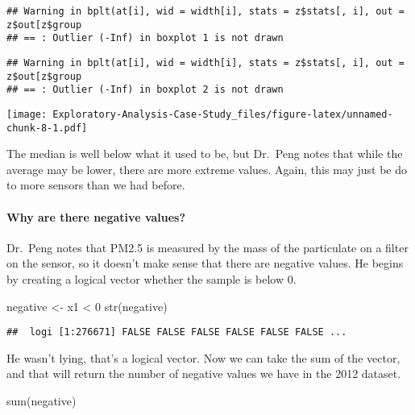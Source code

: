 \documentclass[
]{article}
\newenvironment{Shaded}{\begin{snugshade}}{\end{snugshade}}
\newcommand{\DecValTok}[1]{\textcolor[rgb]{0.00,0.00,0.81}{#1}}
\newcommand{\FunctionTok}[1]{\textcolor[rgb]{0.00,0.00,0.00}{#1}}
\newcommand{\NormalTok}[1]{#1}
\newcommand{\OtherTok}[1]{\textcolor[rgb]{0.56,0.35,0.01}{#1}}
\newcommand{\SpecialCharTok}[1]{\textcolor[rgb]{0.00,0.00,0.00}{#1}}
\begin{document}
\begin{verbatim}
## Warning in bplt(at[i], wid = width[i], stats = z$stats[, i], out = z$out[z$group
## == : Outlier (-Inf) in boxplot 1 is not drawn
\end{verbatim}

\begin{verbatim}
## Warning in bplt(at[i], wid = width[i], stats = z$stats[, i], out = z$out[z$group
## == : Outlier (-Inf) in boxplot 2 is not drawn
\end{verbatim}

\texttt{[image: Exploratory-Analysis-Case-Study\_files/figure-latex/unnamed-chunk-8-1.pdf]}

The median is well below what it used to be, but Dr.~Peng notes that
while the average may be lower, there are more extreme values. Again,
this may just be do to more sensors than we had before.

\hypertarget{why-are-there-negative-values}{%
\paragraph{Why are there negative
values?}\label{why-are-there-negative-values}}

Dr.~Peng notes that PM2.5 is measured by the mass of the particulate on
a filter on the sensor, so it doesn't make sense that there are negative
values. He begins by creating a logical vector whether the sample is
below 0.

\begin{Shaded}
\begin{Highlighting}[]
\NormalTok{negative }\OtherTok{\textless{}{-}}\NormalTok{ x1 }\SpecialCharTok{\textless{}} \DecValTok{0} 
\FunctionTok{str}\NormalTok{(negative)}
\end{Highlighting}
\end{Shaded}

\begin{verbatim}
##  logi [1:276671] FALSE FALSE FALSE FALSE FALSE FALSE ...
\end{verbatim}

He wasn't lying, that's a logical vector. Now we can take the sum of the
vector, and that will return the number of negative values we have in
the 2012 dataset.

\begin{Shaded}
\begin{Highlighting}[]
\FunctionTok{sum}\NormalTok{(negative)}
\end{Highlighting}
\end{Shaded}
\end{document}
